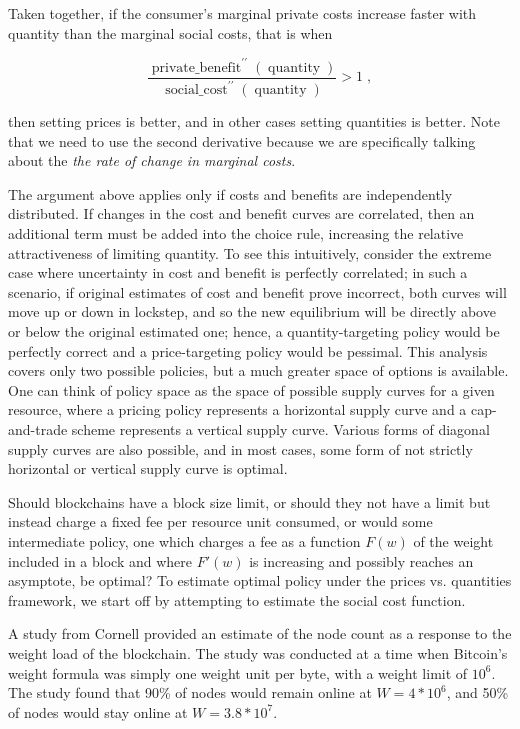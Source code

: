 \documentclass[12pt, final]{article}
\newcommand{\fname}[1]{ \operatorname{ #1 } }
\newcommand{\opname}[1]{ \operatorname{ #1 } }
\begin{document}
Taken together, if the consumer's marginal private costs increase faster with quantity than the marginal social costs, that is when

\begin{equation}
\frac{ \fname{private\_benefit}^{\prime \prime}( \opname{quantity} ) }{ \fname{social\_cost}^{\prime \prime}( \opname{quantity}) }  > 1 \; ,
\end{equation}

then setting prices is better, and in other cases setting quantities is better.  Note that we need to use the second derivative because we are specifically talking about the \emph{the rate of change in marginal costs}.

The argument above applies only if costs and benefits are independently distributed. If changes in the cost and benefit curves are correlated, then an additional term must be added into the choice rule, increasing the relative attractiveness of limiting quantity. To see this intuitively, consider the extreme case where uncertainty in cost and benefit is perfectly correlated; in such a scenario, if original estimates of cost and benefit prove incorrect, both curves will move up or down in lockstep, and so the new equilibrium will be directly above or below the original estimated one; hence, a quantity-targeting policy would be perfectly correct and a price-targeting policy would be pessimal. This analysis covers only two possible policies, but a much greater space of options is available.  One can think of policy space as the space of possible supply curves for a given resource, where a pricing policy represents a horizontal supply curve and a cap-and-trade scheme represents a vertical supply curve. Various forms of diagonal supply curves are also possible, and in most cases, some form of not strictly horizontal or vertical supply curve is optimal.

Should blockchains have a block size limit, or should they not have a limit but instead charge a fixed fee per resource unit consumed, or would some intermediate policy, one which charges a fee as a function $F(w)$ of the weight included in a block and where $F'(w)$ is increasing and possibly reaches an asymptote, be optimal? To estimate optimal policy under the prices vs. quantities framework, we start off by attempting to estimate the social cost function.

A study from Cornell\cite{cornell} provided an estimate of the node count as a response to the weight load of the blockchain. The study was conducted at a time when Bitcoin's weight formula was simply one weight unit per byte, with a weight limit of $10^6$. The study found that 90\% of nodes would remain online at $W = 4*10^6$, and 50\% of nodes would stay online at $W = 3.8 * 10^7$.
\end{document}
